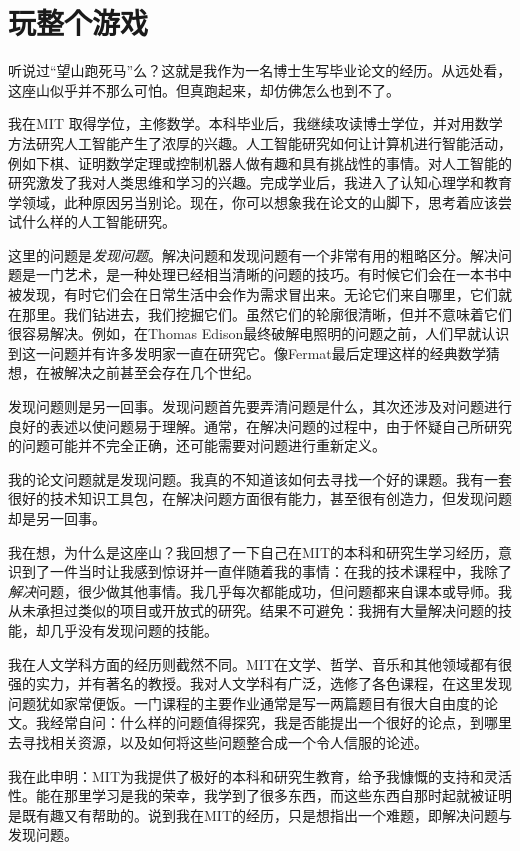 \chapter{玩整个游戏}
听说过“望山跑死马”么？这就是我作为一名博士生写毕业论文的经历。从远处看，这座山似乎并不那么可怕。但真跑起来，却仿佛怎么也到不了。

我在MIT 取得学位，主修数学。本科毕业后，我继续攻读博士学位，并对用数学方法研究人工智能产生了浓厚的兴趣。人工智能研究如何让计算机进行智能活动，例如下棋、证明数学定理或控制机器人做有趣和具有挑战性的事情。对人工智能的研究激发了我对人类思维和学习的兴趣。完成学业后，我进入了认知心理学和教育学领域，此种原因另当别论。现在，你可以想象我在论文的山脚下，思考着应该尝试什么样的人工智能研究。

这里的问题是\textit{发现问题}。解决问题和发现问题有一个非常有用的粗略区分。解决问题是一门艺术，是一种处理已经相当清晰的问题的技巧。有时候它们会在一本书中被发现，有时它们会在日常生活中会作为需求冒出来。无论它们来自哪里，它们就在那里。我们钻进去，我们挖掘它们。虽然它们的轮廓很清晰，但并不意味着它们很容易解决。例如，在Thomas Edison最终破解电照明的问题之前，人们早就认识到这一问题并有许多发明家一直在研究它。像Fermat最后定理这样的经典数学猜想，在被解决之前甚至会存在几个世纪。

发现问题则是另一回事。发现问题首先要弄清问题是什么，其次还涉及对问题进行良好的表述以使问题易于理解。通常，在解决问题的过程中，由于怀疑自己所研究的问题可能并不完全正确，还可能需要对问题进行重新定义。

我的论文问题就是发现问题。我真的不知道该如何去寻找一个好的课题。我有一套很好的技术知识工具包，在解决问题方面很有能力，甚至很有创造力，但发现问题却是另一回事。

我在想，为什么是这座山？我回想了一下自己在MIT的本科和研究生学习经历，意识到了一件当时让我感到惊讶并一直伴随着我的事情：在我的技术课程中，我除了\textit{解决}问题，很少做其他事情。我几乎每次都能成功，但问题都来自课本或导师。我从未承担过类似的项目或开放式的研究。结果不可避免：我拥有大量解决问题的技能，却几乎没有发现问题的技能。

我在人文学科方面的经历则截然不同。MIT在文学、哲学、音乐和其他领域都有很强的实力，并有著名的教授。我对人文学科有广泛，选修了各色课程，在这里发现问题犹如家常便饭。一门课程的主要作业通常是写一两篇题目有很大自由度的论文。我经常自问：什么样的问题值得探究，我是否能提出一个很好的论点，到哪里去寻找相关资源，以及如何将这些问题整合成一个令人信服的论述。

我在此申明：MIT为我提供了极好的本科和研究生教育，给予我慷慨的支持和灵活性。能在那里学习是我的荣幸，我学到了很多东西，而这些东西自那时起就被证明是既有趣又有帮助的。说到我在MIT的经历，只是想指出一个难题，即解决问题与发现问题。


